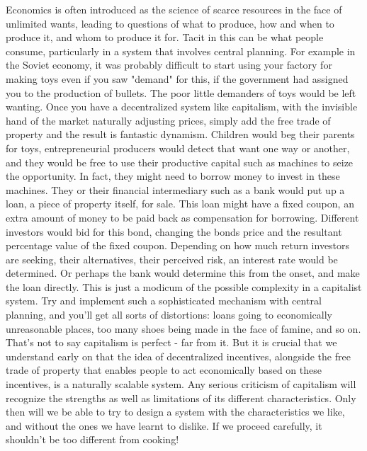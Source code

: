 \documentclass[12pt]{memoir}
\begin{document}
			Economics is often introduced as the science of scarce resources in the face of unlimited wants, leading to questions of what to produce, how and when to produce it, and whom to produce it for. Tacit in this can 
			be what people consume, particularly in a system that involves central planning. For example in the Soviet economy, it was probably difficult to start using your factory for making toys even if you 
			saw "demand" for this, if the government had assigned you to the production of bullets. The poor little demanders of toys would be left wanting. Once you have a decentralized system like capitalism, with the 
			invisible hand of the market naturally adjusting prices, simply add the free trade of property and the result is fantastic dynamism. Children would beg their parents for toys, entrepreneurial producers would 
			detect that want one way or another, and they would be free to use their productive capital such as machines to seize the opportunity. In fact, they might need to borrow money to invest in these machines. 
			They or their financial intermediary such as a bank would put up a loan, a piece of property itself, for sale. This loan might have a fixed coupon, an extra amount of money to be paid back as compensation for
			borrowing. Different investors would bid for this bond, changing the bonds price and the resultant percentage value of the fixed coupon. Depending on how much return investors are seeking, their alternatives, 
			their perceived risk, an interest rate would be determined. Or perhaps the bank would determine this from the onset, and make the loan directly. This is just a modicum of the possible complexity in a capitalist 
			system. Try and implement such a sophisticated mechanism with central planning, and you'll get all sorts of distortions: loans going to economically unreasonable places, too many shoes being made in the face 
			of famine, and so on. That's not to say capitalism is perfect - far from it. But it is crucial that we understand early on that the idea of decentralized incentives, alongside the free trade of property that enables 
			people to act economically based on these incentives, is a naturally scalable system. Any serious criticism of capitalism will recognize the strengths as well as limitations of its different characteristics. Only then will 
			we be able to try to design a system with the characteristics we like, and without the ones we have learnt to dislike. If we proceed carefully, it shouldn't be too different from cooking!\
			 
\end{document}
